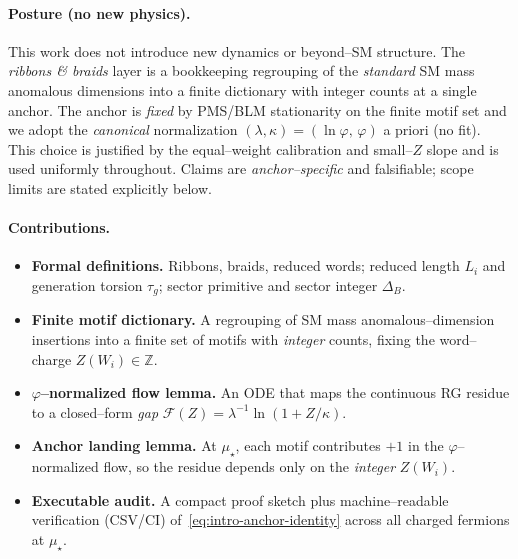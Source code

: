 \documentclass[epjc3]{svjour3}
\begin{document}
\paragraph{Posture (no new physics).}
This work does not introduce new dynamics or beyond--SM structure. The \emph{ribbons \& braids} layer is a bookkeeping regrouping of the \emph{standard} SM mass anomalous dimensions into a finite dictionary with integer counts at a single anchor. The anchor is \emph{fixed} by PMS/BLM stationarity on the finite motif set and we adopt the \emph{canonical} normalization
$(\lambda,\kappa)=(\ln\varphi,\,\varphi)$ a priori (no fit). This choice is justified by the equal--weight calibration and small--$Z$ slope and is used uniformly throughout. Claims are \emph{anchor--specific} and falsifiable; scope limits are stated explicitly below.

\paragraph{Contributions.}
\begin{itemize}
  \item \textbf{Formal definitions.} Ribbons, braids, reduced words; reduced length $L_i$ and generation torsion $\tau_g$; sector primitive and sector integer $\Delta_B$.
  \item \textbf{Finite motif dictionary.} A regrouping of SM mass anomalous--dimension insertions into a finite set of motifs with \emph{integer} counts, fixing the word--charge $Z(W_i)\in\mathbb Z$.
  \item \textbf{$\varphi$--normalized flow lemma.} An ODE that maps the continuous RG residue to a closed--form \emph{gap} $\mathcal F(Z)=\lambda^{-1}\ln(1+Z/\kappa)$.
  \item \textbf{Anchor landing lemma.} At $\mu_\star$, each motif contributes $+1$ in the $\varphi$--normalized flow, so the residue depends only on the \emph{integer} $Z(W_i)$.
  \item \textbf{Executable audit.} A compact proof sketch plus machine--readable verification (CSV/CI) of~\eqref{eq:intro-anchor-identity} across all charged fermions at $\mu_\star$.
\end{itemize}
\end{document}
